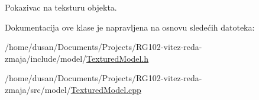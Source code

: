 Pokazivac na teksturu objekta. 



Dokumentacija ove klase je napravljena na osnovu sledećih datoteka\+:\begin{DoxyCompactItemize}
\item 
/home/dusan/\+Documents/\+Projects/\+R\+G102-\/vitez-\/reda-\/zmaja/include/model/\hyperlink{TexturedModel_8h}{Textured\+Model.\+h}\item 
/home/dusan/\+Documents/\+Projects/\+R\+G102-\/vitez-\/reda-\/zmaja/src/model/\hyperlink{TexturedModel_8cpp}{Textured\+Model.\+cpp}\end{DoxyCompactItemize}
